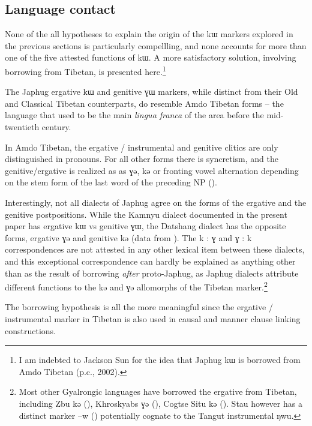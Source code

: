 \documentclass[oldfontcommands,oneside,a4paper,11pt]{article}
\newcommand{\ipa}[1]{{\phon #1}} %
\begin{document}
\subsection{Language contact} \label{sec:contact}
None of the all hypotheses to explain the origin of the \ipa{kɯ} markers explored in the previous sections is particularly compellling, and none  accounts for more than one of the five attested functions of \ipa{kɯ}. A more satisfactory solution, involving borrowing from Tibetan, is presented here.\footnote{I am indebted to Jackson Sun for the idea that Japhug \ipa{kɯ} is borrowed from Amdo Tibetan (p.c., 2002). }

The Japhug ergative \ipa{kɯ} and genitive \ipa{ɣɯ} markers, while distinct from their Old and Classical Tibetan counterparts, do resemble Amdo Tibetan forms -- the language that used to be the main \textit{lingua franca} of the area before the mid-twentieth century.

In Amdo Tibetan, the ergative / instrumental and genitive clitics are only distinguished in pronouns. For all other forms there is syncretism, and the genitive/ergative is realized as as \ipa{ɣə}, \ipa{kə} or fronting vowel alternation depending on the stem form of the last word of the preceding NP (\citealt[62]{haller04themchen}). 

Interestingly, not all dialects of Japhug agree on the forms of the ergative and the genitive postpositions. While the Kamnyu dialect documented in the present paper has ergative \ipa{kɯ} vs genitive \ipa{ɣɯ}, the Datshang dialect has the opposite forms, ergative \ipa{ɣə} and genitive \ipa{kə} (data from \citealt[63-4]{lin11direction}). The \ipa{k} : \ipa{ɣ } and \ipa{ɣ} : \ipa{k} correspondences are not attested in any other lexical item between these dialects, and this exceptional correspondence can hardly be explained as anything other than as the result of borrowing \textit{after} proto-Japhug,  as Japhug dialects attribute  different functions to the \ipa{kə} and \ipa{ɣə} allomorphs of the Tibetan marker.\footnote{Most other Gyalrongic languages have borrowed the ergative from Tibetan, including Zbu \ipa{kə} (\citealt{gongxun14agreement}), Khroskyabs \ipa{ɣə} (\citealt[36]{lai13affixale}), Cogtse Situ \ipa{kə}  (\citealt[336]{linxr93jiarong}). Stau however has a distinct marker \ipa{--w} (\citealt{jacques14rtau}) potentially cognate to the Tangut instrumental \ipa{ŋwu}.}
 
The borrowing hypothesis is all the more meaningful since the ergative / instrumental marker in Tibetan is also used in causal and manner clause linking constructions. 
\end{document}
